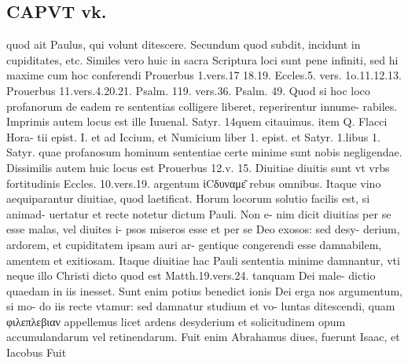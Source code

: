 \documentclass{article}
\begin{document}
\begin{pages}
\section*{CAPVT  vk. }
\marginpar{[ p.443 ]}\pstart quod ait Paulus, qui volunt ditescere. Secundum quod subdit, incidunt in cupiditates, etc.  \pend\pstart Similes vero huic in sacra Scriptura loci sunt pene infiniti, sed hi maxime cum hoc conferendi Prouerbus 1.vers.17 18.19. Eccles.5. vers. 1o.11.12.13. Prouerbus 11.vers.4.20.21. Psalm. 119. vers.36. Psalm. 49. Quod si hoc loco profanorum de eadem re sententias colligere liberet, reperirentur innume- rabiles. Imprimis autem locus est ille Iuuenal. Satyr. 14quem citauimus. item Q. Flacci Hora- tii epist. I. et ad Iccium, et Numicium liber 1. epist. et Satyr. 1.libus 1. Satyr. quae profanosum hominum sententiae certe minime sunt nobis negligendae.  \pend\pstart Dissimilis autem huic locus est Prouerbus 12.v. 15. Diuitiae diuitis sunt vt vrbs fortitudinis Eccles. 10.vers.19. argentum ἱCδυναμε͂ rebus omnibus. Itaque vino aequiparantur diuitiae, quod laetificat.  \pend\pstart Horum locorum solutio facilis est, si animad- uertatur et recte notetur dictum Pauli. Non e- nim dicit diuitias per se esse malas, vel diuites i- psos miseros esse et per se Deo exosos: sed desy- derium, ardorem, et cupiditatem ipsam auri ar- gentique congerendi esse damnabilem, amentem et exitiosam. Itaque diuitiae hac Pauli sententia minime damnantur, vti neque illo Christi dicto quod est Matth.19.vers.24. tanquam Dei male- dictio quaedam in iis inesset. Sunt enim potius benedict ionis Dei erga nos argumentum, si mo- do iis recte vtamur: sed damnatur studium et vo- luntas ditescendi, quam φιλεπλεβιαν appellemus licet ardens desyderium et solicitudinem opum accumulandarum vel retinendarum. Fuit enim Abrahamus diues, fuerunt Isaac, et Iacobus  Fuit  \pend

\end{pages}
\end{document}
